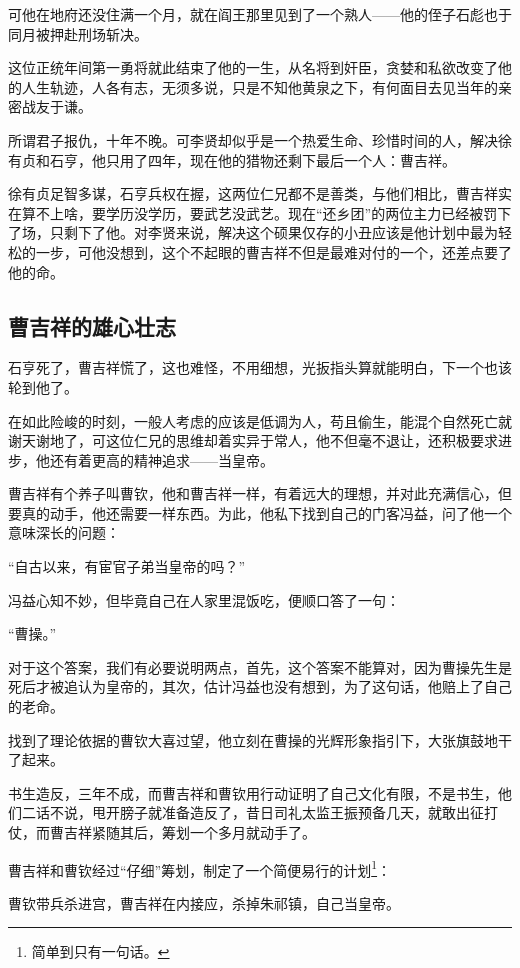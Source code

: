 \begin{multicols}{\theparacolNo}
		可他在地府还没住满一个月，就在阎王那里见到了一个熟人——他的侄子石彪也于同月被押赴刑场斩决。

		这位正统年间第一勇将就此结束了他的一生，从名将到奸臣，贪婪和私欲改变了他的人生轨迹，人各有志，无须多说，只是不知他黄泉之下，有何面目去见当年的亲密战友于谦。

		所谓君子报仇，十年不晚。可李贤却似乎是一个热爱生命、珍惜时间的人，解决徐有贞和石亨，他只用了四年，现在他的猎物还剩下最后一个人：曹吉祥。

		徐有贞足智多谋，石亨兵权在握，这两位仁兄都不是善类，与他们相比，曹吉祥实在算不上啥，要学历没学历，要武艺没武艺。现在“还乡团”的两位主力已经被罚下了场，只剩下了他。对李贤来说，解决这个硕果仅存的小丑应该是他计划中最为轻松的一步，可他没想到，这个不起眼的曹吉祥不但是最难对付的一个，还差点要了他的命。

		\subsection{曹吉祥的雄心壮志}
		石亨死了，曹吉祥慌了，这也难怪，不用细想，光扳指头算就能明白，下一个也该轮到他了。

		在如此险峻的时刻，一般人考虑的应该是低调为人，苟且偷生，能混个自然死亡就谢天谢地了，可这位仁兄的思维却着实异于常人，他不但毫不退让，还积极要求进步，他还有着更高的精神追求——当皇帝。

		曹吉祥有个养子叫曹钦，他和曹吉祥一样，有着远大的理想，并对此充满信心，但要真的动手，他还需要一样东西。为此，他私下找到自己的门客冯益，问了他一个意味深长的问题：

		“自古以来，有宦官子弟当皇帝的吗？”

		冯益心知不妙，但毕竟自己在人家里混饭吃，便顺口答了一句：

		“曹操。”

		对于这个答案，我们有必要说明两点，首先，这个答案不能算对，因为曹操先生是死后才被追认为皇帝的，其次，估计冯益也没有想到，为了这句话，他赔上了自己的老命。

		找到了理论依据的曹钦大喜过望，他立刻在曹操的光辉形象指引下，大张旗鼓地干了起来。

		书生造反，三年不成，而曹吉祥和曹钦用行动证明了自己文化有限，不是书生，他们二话不说，甩开膀子就准备造反了，昔日司礼太监王振预备几天，就敢出征打仗，而曹吉祥紧随其后，筹划一个多月就动手了。

		曹吉祥和曹钦经过“仔细”筹划，制定了一个简便易行的计划\footnote{简单到只有一句话。}：

		曹钦带兵杀进宫，曹吉祥在内接应，杀掉朱祁镇，自己当皇帝。


\end{multicols}
